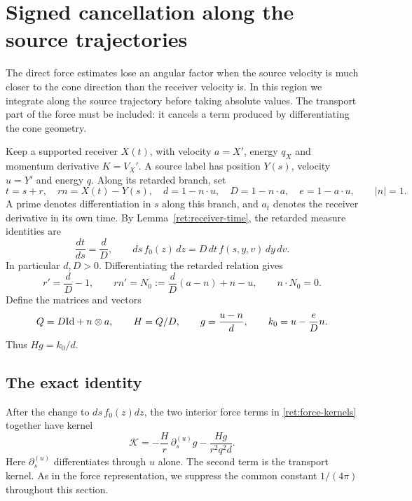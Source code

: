 \section{Signed cancellation along the source trajectories}
\label{can:section}

The direct force estimates lose an angular factor when the source velocity
is much closer to the cone direction than the receiver velocity is. In
this region we integrate along the source trajectory before taking absolute
values. The transport part of the force must be included: it cancels a
term produced by differentiating the cone geometry.

Keep a supported receiver $X(t)$, with velocity $a=X'$, energy $q_X$ and
momentum derivative $K=V_X'$. A source label has position $Y(s)$, velocity
$u=Y'$ and energy $q$. Along its retarded branch, set
\[
 t=s+r,\quad rn=X(t)-Y(s),\quad
 d=1-n\cdot u,\quad D=1-n\cdot a,\quad e=1-a\cdot u,
 \qquad |n|=1.
\]
A prime denotes differentiation in $s$ along this branch, and $a_t$ denotes
the receiver derivative in its own time. By
Lemma~\ref{ret:receiver-time}, the retarded measure identities are
\begin{equation}\label{can:measure}
 \frac{dt}{ds}=\frac dD,
 \qquad ds\,f_0(z)\,dz=D\,dt\,f(s,y,v)\,dy\,dv.
\end{equation}
In particular $d,D>0$. Differentiating the retarded relation gives
\begin{equation}\label{can:geometry}
 r'=\frac dD-1,\qquad
 rn'=N_0:=\frac dD(a-n)+n-u,\qquad n\cdot N_0=0.
\end{equation}
Define the matrices and vectors
\begin{equation}\label{can:definitions}
 Q=D\mathrm{Id}+n\otimes a,\qquad H=Q/D,\qquad
 g=\frac{u-n}{d},\qquad k_0=u-\frac eD n.
\end{equation}
Thus $Hg=k_0/d$.

\subsection{The exact identity}

After the change to $ds\,f_0(z)dz$, the two interior force terms in
\eqref{ret:force-kernels} together have kernel
\begin{equation}\label{can:input-kernel}
 \mathcal K=-\frac Hr\,\partial_s^{(u)}g
             -\frac{Hg}{r^2q^2d}.
\end{equation}
Here $\partial_s^{(u)}$ differentiates through $u$ alone. The second term
is the transport kernel. As in the force representation, we suppress the
common constant $1/(4\pi)$ throughout this section.

